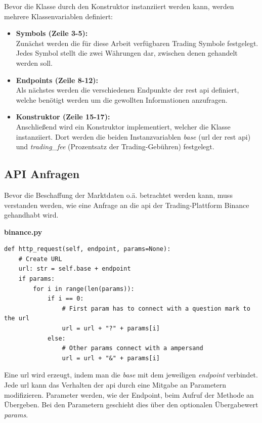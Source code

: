 \documentclass[oneside]{ausarbeitung}
\begin{document}
Bevor die Klasse durch den Konstruktor instanziiert werden kann, werden mehrere Klassenvariablen definiert: \\
\begin{itemize}
	\item \textbf{Symbols (Zeile 3-5):} \\
		Zunächst werden die für diese Arbeit verfügbaren Trading Symbole
		festgelegt. Jedes Symbol stellt die zwei Währungen dar, zwischen denen
		gehandelt werden soll.
	\item \textbf{Endpoints (Zeile 8-12):} \\
		Als nächstes werden die verschiedenen Endpunkte der \ac{rest} \ac{api}
		definiert, welche benötigt werden um die gewollten Informationen
		anzufragen.
	\item \textbf{Konstruktor (Zeile 15-17):} \\
		Anschließend wird ein Konstruktor implementiert, welcher die Klasse 
		instanziiert. Dort werden die beiden Instanzvariablen \textit{base} 
		(\ac{url} der \ac{rest} \ac{api}) und \textit{trading\_fee} (Prozentsatz 
		der Trading-Gebühren) festgelegt. 	

\end{itemize}
\subsection{API Anfragen}
\label{sub:api_anfragen}

Bevor die Beschaffung der Marktdaten o.ä. betrachtet werden kann, muss verstanden werden, wie eine Anfrage an die \ac{api} der Trading-Plattform Binance gehandhabt wird.

\lstset{language=Python}
\lstset{frame=lines}
\lstset{basicstyle=\footnotesize}
\textbf{binance.py}
\begin{lstlisting}
def http_request(self, endpoint, params=None):
	# Create URL
	url: str = self.base + endpoint
	if params:
		for i in range(len(params)):
			if i == 0:
				# First param has to connect with a question mark to the url
				url = url + "?" + params[i]
			else:
				# Other params connect with a ampersand
				url = url + "&" + params[i]
\end{lstlisting}

Eine \ac{url} wird erzeugt, indem man die \textit{base} mit dem jeweiligen \textit{endpoint} verbindet. Jede \ac{url} kann das Verhalten der \ac{api} durch eine Mitgabe an Parametern modifizieren. Parameter werden, wie der Endpoint, beim Aufruf der Methode an Übergeben. Bei den Parametern geschieht dies über den optionalen Übergabewert \textit{params}. 
\end{document}
